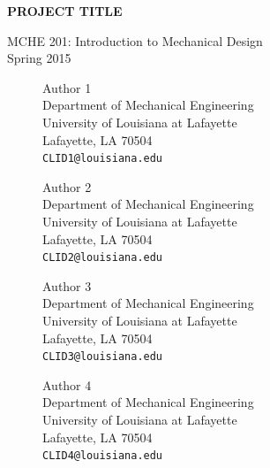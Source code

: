 \documentclass[11pt]{article}
\begin{document}
\thispagestyle{empty}
\begin{center}
\vspace*{1.5in}
{\LARGE \textbf{PROJECT TITLE}} %

{\Large MCHE 201: Introduction to Mechanical Design\\ \vspace*{0.1in} Spring 2015}

\vspace*{2.5in}

\begin{figure}[!h]
\begin{minipage}{0.45\textwidth}
\begin{center}
Author 1 \\
Department of Mechanical Engineering\\
University of Louisiana at Lafayette\\
Lafayette, LA 70504\\
{\tt CLID1@louisiana.edu}
\end{center}
\end{minipage}
\hspace{0.08\textwidth}
\begin{minipage}{0.45\textwidth}
\begin{center}
Author 2 \\
Department of Mechanical Engineering\\
University of Louisiana at Lafayette\\
Lafayette, LA 70504\\
\tt{CLID2@louisiana.edu}
\end{center}
\end{minipage}
\end{figure}
%
\vspace{0.2in}
\begin{figure}[!h]
\begin{minipage}{0.45\textwidth}
\begin{center}
Author 3 \\
Department of Mechanical Engineering\\
University of Louisiana at Lafayette\\
Lafayette, LA 70504\\
{\tt CLID3@louisiana.edu}
\end{center}
\end{minipage}
\hspace{0.08\textwidth}
\begin{minipage}{0.45\textwidth}
\begin{center}
Author 4 \\
Department of Mechanical Engineering\\
University of Louisiana at Lafayette\\
Lafayette, LA 70504\\
\tt{CLID4@louisiana.edu}
\end{center}
\end{minipage}
\end{figure}

\end{center}
\end{document}
